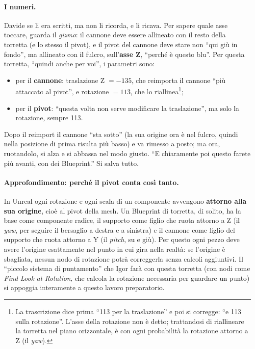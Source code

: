 \paragraph{I numeri.} Davide se li era scritti, ma non li ricorda, e li ricava. Per
sapere quale asse toccare, guarda il \emph{gizmo}: il cannone deve essere allineato con
il resto della torretta (e lo stesso il pivot), e il pivot del cannone deve stare non
``qui giù in fondo'', ma allineato con il fulcro, sull'\textbf{asse Z}, ``perché è
questo blu''. Per questa torretta, ``quindi anche per voi'', i parametri sono:
\begin{itemize}
  \item per il \textbf{cannone}: traslazione Z $= -135$, che reimporta il cannone ``più
        attaccato al pivot'', e rotazione $= 113$, che lo riallinea\footnote{La
        trascrizione dice prima ``113 per la traslazione'' e poi si corregge: ``e 113
        sulla rotazione''. L'asse della rotazione non è detto; trattandosi di
        riallineare la torretta nel piano orizzontale, è con ogni probabilità la
        rotazione attorno a Z (il \emph{yaw}).};
  \item per il \textbf{pivot}: ``questa volta non serve modificare la traslazione'', ma
        solo la rotazione, sempre 113.
\end{itemize}
Dopo il reimport il cannone ``sta sotto'' (la sua origine ora è nel fulcro, quindi
nella posizione di prima risulta più basso) e va rimesso a posto; ma ora, ruotandolo, si
alza e si abbassa nel modo giusto. ``E chiaramente poi questo farete più avanti, con dei
Blueprint.'' Si salva tutto.

\paragraph{Approfondimento: perché il pivot conta così tanto.} In Unreal ogni rotazione
e ogni scala di un componente avvengono \textbf{attorno alla sua origine}, cioè al
pivot della mesh. Un Blueprint di torretta, di solito, ha la base come componente
radice, il supporto come figlio che ruota attorno a Z (il \emph{yaw}, per seguire il
bersaglio a destra e a sinistra) e il cannone come figlio del supporto che ruota attorno
a Y (il \emph{pitch}, su e giù). Per questo ogni pezzo deve avere l'origine esattamente
nel punto in cui gira nella realtà: se l'origine è sbagliata, nessun nodo di rotazione
potrà correggerla senza calcoli aggiuntivi. Il ``piccolo sistema di puntamento'' che
Igor farà con questa torretta (con nodi come \emph{Find Look at Rotation}, che calcola
la rotazione necessaria per guardare un punto) si appoggia interamente a questo lavoro
preparatorio.

